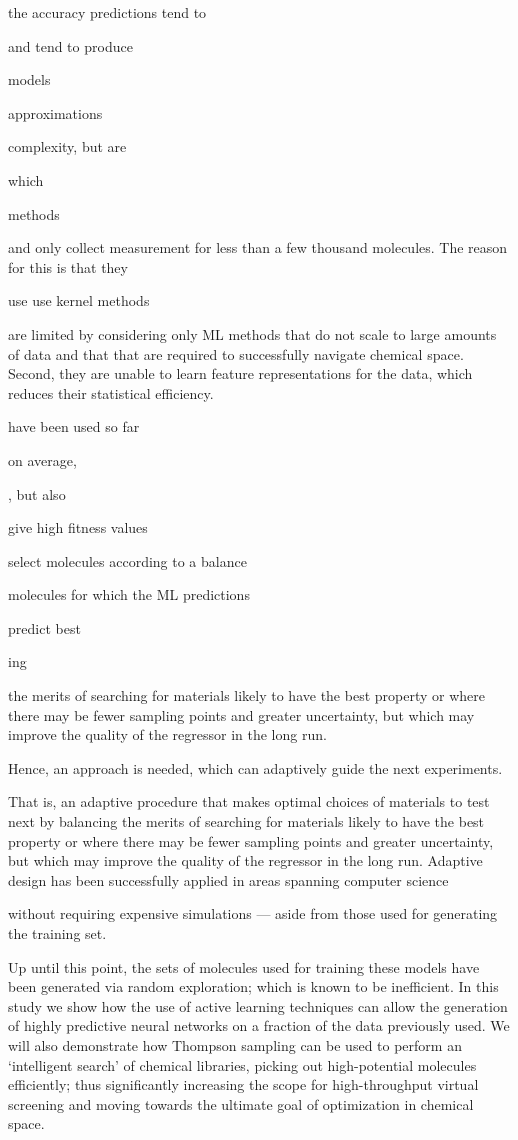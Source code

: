 \documentclass{pnastwo}
\begin{document}
\begin{article}
the accuracy predictions tend to


 and tend to produce


models 

approximations

complexity, but are

which 

 methods


and only collect measurement for less than a few thousand molecules.
The reason for this is that they

use use kernel methods


are limited by considering only ML methods that 
do not scale to large amounts of data and that 
that are required to
successfully navigate chemical space. Second, they are unable to learn feature
representations for the data, which reduces their statistical efficiency. 

have been used so far


 on average,

, but also 

give high fitness values

select molecules according to a balance 

molecules for which the ML
predictions 

predict best

ing 

the merits of searching for materials likely to
have the best property or where there may be fewer sampling
points and greater uncertainty, but which may improve the
quality of the regressor in the long run.

Hence, an approach is needed, which can adaptively guide the next experiments. 

That is, an
adaptive procedure that makes optimal choices of materials to test
next by balancing the merits of searching for materials likely to
have the best property or where there may be fewer sampling
points and greater uncertainty, but which may improve the
quality of the regressor in the long run. Adaptive design has been
successfully  applied  in  areas  spanning  computer  science



without requiring expensive simulations --- aside from those used for
generating the training set. 

Up until this point, the sets of molecules used for training these models have been generated via random exploration; which is known to be inefficient.  In this study we show how the use of active learning techniques can allow the generation of highly predictive neural networks on a fraction of the data previously used. We will also demonstrate how Thompson sampling\cite{thompson_likelihood_1933} can be used to perform an `intelligent search' of chemical libraries, picking out high-potential molecules efficiently; thus significantly increasing the scope for high-throughput virtual screening and moving towards the ultimate goal of optimization in chemical space.


\end{article}
\end{document}
